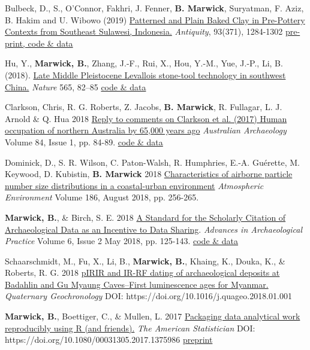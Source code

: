 \documentclass[11pt,article,oneside]{memoir}
\begin{document}
\ind Bulbeck, D., S., O’Connor, Fakhri, J. Fenner,  \textbf{B. Marwick}, Suryatman, F. Aziz, B. Hakim and U. Wibowo (2019) \href{https://doi.org/10.15184/aqy.2019.134}{Patterned and Plain Baked Clay in Pre-Pottery Contexts from Southeast Sulawesi, Indonesia.} \textit{Antiquity}, 93(371), 1284-1302 \href{https://osf.io/jn5tu/}{pre-print, code \& data}

\ind Hu, Y., \textbf{Marwick, B.}, Zhang, J.-F., Rui, X., Hou, Y.-M., Yue, J.-P., Li, B. (2018). \href{https://doi.org/10.1038/s41586-018-0710-1}{Late Middle Pleistocene Levallois stone-tool technology in southwest China.} \textit{Nature}  565, 82–85 \href{https://osf.io/erntj/}{code \& data}

\ind Clarkson, Chris, R. G. Roberts, Z. Jacobs, \textbf{B. Marwick}, R. Fullagar, L. J. Arnold \& Q. Hua 2018 \href{https://doi.org/10.1080/03122417.2018.1462884}{Reply to comments on Clarkson et al. (2017) Human occupation of northern Australia by 65,000 years ago} \textit{Australian Archaeology} Volume 84, Issue 1, pp. 84-89. \href{https://osf.io/qydc9/}{code \& data}

\ind Dominick, D., S. R. Wilson, C. Paton-Walsh, R. Humphries, E.-A. Guérette, M. Keywood, D. Kubistin, \textbf{B. Marwick} 2018 \href{http://doi.org/10.1016/j.atmosenv.2018.05.031}{Characteristics of airborne particle number size distributions in a coastal-urban environment}  \textit{Atmospheric Environment} Volume 186, August 2018, pp. 256-265.

\ind \textbf{Marwick, B.}, \& Birch, S. E. 2018 \href{https://doi.org/10.1017/aap.2018.3}{A Standard for the Scholarly Citation of Archaeological Data as an Incentive to Data Sharing}.  \textit{Advances in Archaeological Practice} Volume 6, Issue 2 May 2018, pp. 125-143. \href{https://doi.org/10.17605/OSF.IO/KSRUZ}{code \& data}

\ind Schaarschmidt, M., Fu, X., Li, B., \textbf{Marwick, B.}, Khaing, K., Douka, K., \& Roberts, R. G. 2018 \href{https://doi.org/10.1016/j.quageo.2018.01.001}{pIRIR and IR-RF dating of archaeological deposits at Badahlin and Gu Myaung Caves–First luminescence ages for Myanmar.} \textit{Quaternary Geochronology} DOI: https://doi.org/10.1016/j.quageo.2018.01.001

\ind \textbf{Marwick, B.}, Boettiger, C., \& Mullen, L. 2017 \href{https://doi.org/10.1080/00031305.2017.1375986}{Packaging data analytical work reproducibly using R (and friends).} \textit{The American Statistician} \newline DOI: https://doi.org/10.1080/00031305.2017.1375986 \href{https://doi.org/10.7287/peerj.preprints.3192v1}{preprint}
\end{document}
